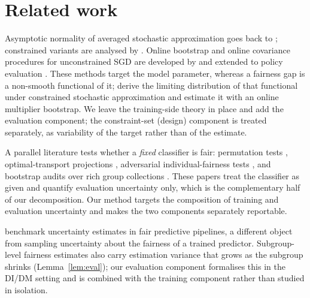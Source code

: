 \documentclass[pdflatex,sn-basic]{sn-jnl}
\begin{document}
\section{Related work}
\label{sec:related}


Asymptotic normality of averaged stochastic approximation goes back to
\citet{polyak1992}; constrained variants are analysed by \citet{duchi2016}.  Online bootstrap and
online covariance procedures for unconstrained SGD are developed by \citet{fang2018,chen2016,zhu2021} and
extended to policy evaluation \citep{ramprasad2023}.  These methods target the model parameter, whereas a fairness gap is a non-smooth functional of it;
\citet{roy2026uq} derive the limiting distribution of that functional under constrained stochastic
approximation and estimate it with an online multiplier bootstrap.  We leave
the training-side theory in place and add the evaluation component; the constraint-set (design)
component is treated separately, as variability of the target rather than of the estimate.


A parallel literature tests whether a \emph{fixed} classifier is fair: permutation tests
\citep{diciccio2020}, optimal-transport projections \citep{taskesen2021}, adversarial individual-fairness
tests \citep{maity2021}, and bootstrap audits over rich group collections \citep{cherian2023}.  These
papers treat the classifier as given and quantify evaluation uncertainty only, which is the
complementary half of our decomposition.  Our method targets the composition of training and
evaluation uncertainty and makes the two components separately reportable.


\citet{rosenblatt2024} benchmark uncertainty estimates in fair predictive pipelines, a different
object from sampling uncertainty about the fairness of a trained predictor.  Subgroup-level fairness estimates also carry
estimation variance that grows as the subgroup shrinks (Lemma~\ref{lem:eval}); our evaluation
component formalises this in the DI/DM setting and is combined with the training component rather
than studied in isolation.

\end{document}
